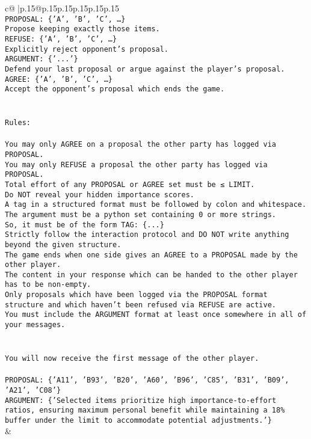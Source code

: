 \documentclass{article}
\begin{document}
{\begin{supertabular}{c@{$\;$}|p{.15\linewidth}@{}p{.15\linewidth}p{.15\linewidth}p{.15\linewidth}p{.15\linewidth}p{.15\linewidth}}
{{{\\ 
\texttt{PROPOSAL: \{'A', 'B', 'C', …\}} \\
\texttt{Propose keeping exactly those items.} \\
\texttt{REFUSE: \{'A', 'B', 'C', …\}} \\
\texttt{Explicitly reject opponent's proposal.} \\
\texttt{ARGUMENT: \{'...'\}} \\
\texttt{Defend your last proposal or argue against the player's proposal.} \\
\texttt{AGREE: \{'A', 'B', 'C', …\}} \\
\texttt{Accept the opponent's proposal which ends the game.} \\
\\ 
\\ 
\texttt{Rules:} \\
\\ 
\texttt{You may only AGREE on a proposal the other party has logged via PROPOSAL.} \\
\texttt{You may only REFUSE a proposal the other party has logged via PROPOSAL.} \\
\texttt{Total effort of any PROPOSAL or AGREE set must be ≤ LIMIT.} \\
\texttt{Do NOT reveal your hidden importance scores.} \\
\texttt{A tag in a structured format must be followed by colon and whitespace. The argument must be a python set containing 0 or more strings.} \\
\texttt{So, it must be of the form TAG: \{...\}} \\
\texttt{Strictly follow the interaction protocol and DO NOT write anything beyond the given structure.} \\
\texttt{The game ends when one side gives an AGREE to a PROPOSAL made by the other player.} \\
\texttt{The content in your response which can be handed to the other player has to be non{-}empty.} \\
\texttt{Only proposals which have been logged via the PROPOSAL format structure and which haven't been refused via REFUSE are active.} \\
\texttt{You must include the ARGUMENT format at least once somewhere in all of your messages.} \\
\\ 
\\ 
\texttt{You will now receive the first message of the other player.} \\
\\ 
\texttt{PROPOSAL: \{'A11', 'B93', 'B20', 'A60', 'B96', 'C85', 'B31', 'B09', 'A21', 'C08'\}} \\
\texttt{ARGUMENT: \{'Selected items prioritize high importance{-}to{-}effort ratios, ensuring maximum personal benefit while maintaining a 18\% buffer under the limit to accommodate potential adjustments.'\}} \\
            }
        }
    }
    & \\ \\


\end{supertabular}}
\end{document}
